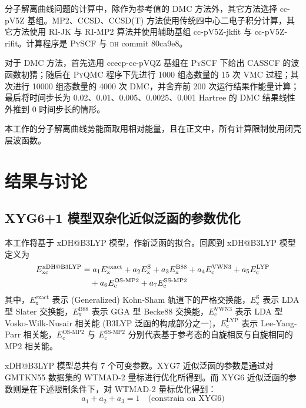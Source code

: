 分子解离曲线问题的计算中，除作为参考值的 DMC 方法外，其它方法选择 cc-pV5Z 基组。MP2、CCSD、CCSD(T) 方法使用传统四中心二电子积分计算，其它方法使用 RI-JK 与 RI-MP2 算法并使用辅助基组 cc-pV5Z-jkfit 与 cc-pV5Z-rifit。计算程序是 \textsc{PySCF} 与 \textsc{dh} commit 80ca9e8。

对于 DMC 方法，首先选用 ccecp-cc-pVQZ 基组在 \textsc{PySCF} 下给出 CASSCF 的波函数初猜；随后在 \textsc{PyQMC} 程序\cite{Wheeler-Wagner.JCP.2023}下先进行 1000 组态数量的 15 次 VMC 过程；其次进行 10000 组态数量的 4000 次 DMC，并舍弃前 200 次运行结果作能量计算；最后将时间步长为 0.02、0.01、0.005、0.0025、0.001 Hartree 的 DMC 结果线性外推到 0 时间步长的情形。

本工作的分子解离曲线势能面取用相对能量，且在正文中，所有计算限制使用闭壳层波函数。

\section{结果与讨论}
\label{sec.2.iepa-results}

\subsection{XYG6+1 模型双杂化近似泛函的参数优化}

本工作将基于 xDH@B3LYP 模型\cite{Zhang-Xu.JPCL.2021}，作新泛函的拟合。回顾到 xDH@B3LYP 模型定义为
\begin{align}
  E_\mathrm{xc}^\text{xDH@B3LYP} &= a_1 E_\mathrm{x}^\mathrm{exact} + a_2 E_\mathrm{x}^\mathrm{S} + a_3 E_\mathrm{x}^\mathrm{B88} + a_4 E_\mathrm{c}^\mathrm{VWN3} + a_5 E_\mathrm{c}^\mathrm{LYP} \notag \\
  &\quad + a_6 E_\mathrm{c}^\text{OS-MP2} + a_7 E_\mathrm{c}^\text{SS-MP2}
\end{align}
其中，$E_\mathrm{x}^\mathrm{exact}$ 表示 (Generalized) Kohn-Sham 轨道下的严格交换能，$E_\mathrm{x}^\mathrm{S}$ 表示 LDA 型 Slater 交换能\cite{Bloch-Bloch.ZP.1929,Dirac-Dirac.MPCPS.1930}，$E_\mathrm{x}^\mathrm{B88}$ 表示 GGA 型 Becke88 交换能\cite{Becke-Becke.PRA.1988}，$E_\mathrm{c}^\mathrm{VWN3}$ 表示 LDA 型 Vosko-Wilk-Nusair 相关能\cite{Vosko-Nusair.CJP.1980} (B3LYP 泛函的构成部分之一\cite{Becke-Becke.JCP.1993,Stephens-Frisch.JPC.1994})，$E_\mathrm{c}^\mathrm{LYP}$ 表示 Lee-Yang-Parr 相关能\cite{Lee-Parr.PRB.1988}，$E_\mathrm{c}^\text{OS-MP2}$ 与 $E_\mathrm{c}^\text{SS-MP2}$ 分别代表基于参考态的自旋相反与自旋相同的 MP2 相关能。

xDH@B3LYP 模型总共有 7 个可变参数。XYG7 近似泛函的参数是通过对 GMTKN55 数据集的 WTMAD-2 量标进行优化所得到。而 XYG6 近似泛函的参数则是在下述限制条件下，对 WTMAD-2 量标优化得到：
\begin{equation}
  \label{eq.2.constrain-xyg6}
  a_1 + a_2 + a_3 = 1 \quad \text{(constrain on XYG6)}
\end{equation}


